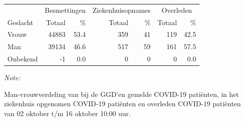 \documentclass[
  english,
  man,floatsintext]{apa6}
\begin{document}
\begin{table}[H]
\centering\begingroup\fontsize{11}{13}\selectfont

\begin{threeparttable}
\begin{tabular}{lrrrrrr}
\toprule
\multicolumn{1}{c}{ } & \multicolumn{2}{c}{Besmettingen} & \multicolumn{2}{c}{Ziekenhuisopnames} & \multicolumn{2}{c}{Overleden} \\
\cmidrule(l{3pt}r{3pt}){2-3} \cmidrule(l{3pt}r{3pt}){4-5} \cmidrule(l{3pt}r{3pt}){6-7}
Geslacht & Totaal & \% & Totaal & \% & Totaal & \%\\
\midrule
Vrouw & 44883 & 53.4 & 359 & 41 & 119 & 42.5\\
Man & 39134 & 46.6 & 517 & 59 & 161 & 57.5\\
Onbekend & -1 & 0.0 & 0 & 0 & 0 & 0.0\\
\bottomrule
\end{tabular}
\begin{tablenotes}
\item \textit{Note: } 
\item Man-vrouwverdeling van bij de GGD’en gemelde COVID-19 patiënten, in het ziekenhuis opgenomen COVID-19 patiënten en overleden COVID-19 patiënten van 02 oktober t/m 16 oktober 10:00 uur.
\end{tablenotes}
\end{threeparttable}
\endgroup{}
\end{table}
\newpage
\end{document}
